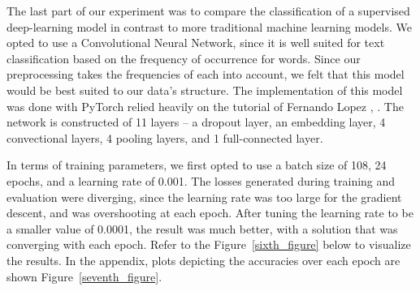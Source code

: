 \documentclass[10pt,twocolumn,letterpaper]{article}
\begin{document}
The last part of our experiment was to compare the classification of a supervised deep-learning model in contrast to more traditional machine learning models. We opted to use a Convolutional Neural Network, since it is well suited for text classification based on the frequency of occurrence for words. Since our preprocessing takes the frequencies of each into account, we felt that this model would be best suited to our data's structure. The implementation of this model was done with PyTorch relied heavily on the tutorial of Fernando Lopez \cite{Fernando}, \cite{githubFer}. The network is constructed of 11 layers – a dropout layer, an embedding layer, 4 convectional layers, 4 pooling layers, and 1 full-connected layer. \par
In terms of training parameters, we first opted to use a batch size of 108, 24 epochs, and a learning rate of 0.001. The losses generated during training and evaluation were diverging, since the learning rate was too large for the gradient descent, and was overshooting at each epoch. After tuning the learning rate to be a smaller value of 0.0001, the result was much better, with a solution that was converging with each epoch. Refer to the Figure~\ref{sixth_figure} below to visualize the results. In the appendix, plots depicting the accuracies over each epoch are shown Figure~\ref{seventh_figure}.
\end{document}
